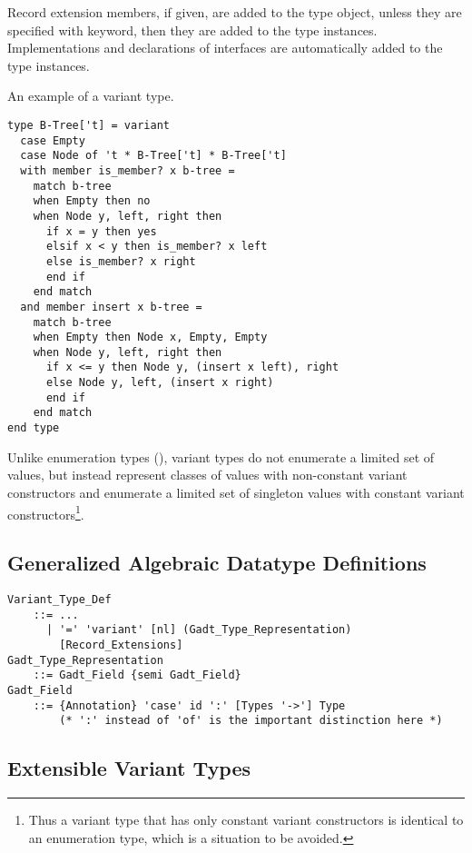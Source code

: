 Record extension members, if given, are added to the type object, unless they are specified with  keyword, then they are added to the type instances. Implementations and declarations of interfaces are automatically added to the type instances. 

\example An example of a variant type. 
\begin{lstlisting}
type B-Tree['t] = variant 
  case Empty
  case Node of 't * B-Tree['t] * B-Tree['t]
  with member is_member? x b-tree =
    match b-tree
    when Empty then no
    when Node y, left, right then
      if x = y then yes
      elsif x < y then is_member? x left
      else is_member? x right
      end if
    end match
  and member insert x b-tree = 
    match b-tree
    when Empty then Node x, Empty, Empty
    when Node y, left, right then
      if x <= y then Node y, (insert x left), right
      else Node y, left, (insert x right)
      end if
    end match
end type
\end{lstlisting}

Unlike enumeration types (), variant types do not enumerate a limited set of values, but instead represent classes of values with non-constant variant constructors and enumerate a limited set of singleton values with constant variant constructors\footnote{Thus a variant type that has only constant variant constructors is identical to an enumeration type, which is a situation to be avoided.}. 





\subsection{Generalized Algebraic Datatype Definitions}
\label{sec:gadt-types}

\grammar\begin{lstlisting}
Variant_Type_Def 
    ::= ...
      | '=' 'variant' [nl] (Gadt_Type_Representation) 
        [Record_Extensions]
Gadt_Type_Representation 
    ::= Gadt_Field {semi Gadt_Field}
Gadt_Field 
    ::= {Annotation} 'case' id ':' [Types '->'] Type  
        (* ':' instead of 'of' is the important distinction here *)
\end{lstlisting}







\subsection{Extensible Variant Types}
\label{sec:extensible-variant-types}

